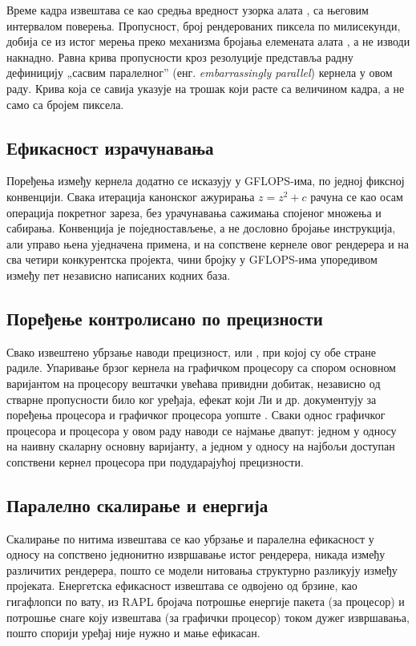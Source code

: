 \documentclass[serbian]{ftndiplomski}
\begin{document}
Време кадра извештава се као средња вредност узорка алата , са
његовим интервалом поверења. Пропусност, број рендерованих пиксела по милисекунди,
добија се из истог мерења преко механизма бројања елемената алата , а
не изводи накнадно. Равна крива пропусности кроз резолуције представља радну
дефиницију „сасвим паралелног'' (енг. \emph{embarrassingly parallel}) кернела у овом раду.
Крива која се савија указује на трошак који расте са величином кадра, а не само са
бројем пиксела.

\subsection{Ефикасност израчунавања}
\label{sec:metrics-gflops}

Поређења између кернела додатно се исказују у GFLOPS-има, по једној фиксној
конвенцији. Свака итерација канонског ажурирања $z = z^2 + c$ рачуна се као осам
операција покретног зареза, без урачунавања сажимања спојеног множења и сабирања.
Конвенција је поједностављење, а не дословно бројање инструкција, али управо њена
уједначена примена, и на сопствене кернеле овог рендерера и на сва четири
конкурентска пројекта, чини бројку у GFLOPS-има упоредивом између пет независно
написаних кодних база.

\subsection{Поређење контролисано по прецизности}
\label{sec:metrics-precision}

Свако извештено убрзање наводи прецизност,  или , при којој су
обе стране радиле. Упаривање брзог  кернела на графичком процесору са спором
 основном варијантом на процесору вештачки увећава привидни добитак,
независно од стварне пропусности било ког уређаја, ефекат који Ли и др. документују
за поређења процесора и графичког процесора уопште \cite{lee2010debunking}. Сваки
однос графичког процесора и процесора у овом раду наводи се најмање двапут: једном
у односу на наивну скаларну основну варијанту, а једном у односу на најбољи доступан
сопствени кернел процесора при подударајућој прецизности.

\subsection{Паралелно скалирање и енергија}
\label{sec:scaling-energy}

Скалирање по нитима извештава се као убрзање и паралелна ефикасност у односу на
сопствено једнонитно извршавање истог рендерера, никада између различитих рендерера,
пошто се модели нитовања структурно разликују између пројеката. Енергетска
ефикасност извештава се одвојено од брзине, као гигафлопси по вату, из RAPL бројача
потрошње енергије пакета (за процесор) и потрошње снаге коју извештава
 (за графички процесор) током дужег извршавања, пошто спорији уређај
није нужно и мање ефикасан.
\end{document}
